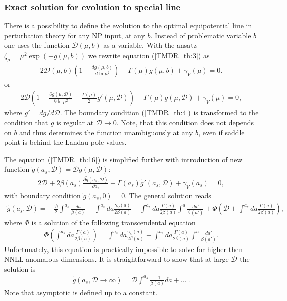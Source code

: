 \documentclass[prd,nofootinbib,eqsecnum,final]{revtex4}
\renewcommand{\(}{\left(}
\renewcommand{\)}{\right)}
\renewcommand{\[}{\left[}
\renewcommand{\]}{\right]}
\begin{document}
\subsubsection{Exact solution for evolution to special line}

There is a possibility to define the evolution to the optimal equipotential line in perturbation theory for any NP input, at any $b$. Instead of problematic variable $b$ one uses the function $\mathcal{D}(\mu,b)$ as a variable. With the ansatz $\zeta_\mu=\mu^2 \exp(-g(\mu,b))$ we rewrite equation (\ref{TMDR_th:3}) as
\begin{eqnarray}
2\mathcal{D}(\mu,b)\(1-\frac{dg(\mu,b)}{d\ln \mu^2}\)-\Gamma(\mu)g(\mu,b)+\gamma_V(\mu)=0.
\end{eqnarray}
or
\begin{eqnarray}\label{TMDR_th:16}
2\mathcal{D}\(1-\frac{\partial g(\mu,\mathcal{D})}{\partial \ln \mu^2}-\frac{\Gamma(\mu)}{2}g'(\mu,\mathcal{D})\)-\Gamma(\mu)g(\mu,\mathcal{D})+\gamma_V(\mu)=0,
\end{eqnarray}
where $g'=d g/d\mathcal{D}$. The boundary condition (\ref{TMDR_th:4}) is transformed to the condition that $g$ is regular at $\mathcal{D}\to 0$. Note, that this condition does not depends on $b$ and thus determines the function unambiguously at any $b$, even if saddle point is behind the Landau-pole values. 

The equation (\ref{TMDR_th:16}) is simplified further with introduction of new function $\tilde g(a_s,\mathcal{D})=\mathcal{D} g(\mu,\mathcal{D})$:
\begin{eqnarray}\label{TMDR_th:17}
2\mathcal{D}+2\beta(a_s)\frac{\partial \tilde g(a_s,\mathcal{D})}{\partial a_s}-\Gamma(a_s)\tilde g'(a_s,\mathcal{D})+\gamma_V(a_s)=0,
\end{eqnarray}
with boundary condition $\tilde g(a_s,0)=0$. The general solution reads
\begin{eqnarray}
\tilde g(a_s,\mathcal{D})=-\frac{\mathcal{D}}{2}\int^{a_s} \frac{da}{\beta(a)}-\int^{a_s} da \frac{\gamma_V(a)}{2\beta(a)}
-\int^{a_s} da \frac{\Gamma(a)}{2\beta(a)}\int^a\frac{da'}{\beta(a')}+\Phi\(\mathcal{D}+\int^{a_s} da \frac{\Gamma(a)}{2\beta(a)}\),
\end{eqnarray}
where $\Phi$ is a solution of the following transcendental equation
\begin{eqnarray}
\Phi\(\int^{a_s} da \frac{\Gamma(a)}{2\beta(a)}\)=\int^{a_s} da \frac{\gamma_V(a)}{2\beta(a)}
+\int^{a_s} da \frac{\Gamma(a)}{2\beta(a)}\int^a\frac{da'}{\beta(a')}.
\end{eqnarray}
Unfortunately, this equation is practically impossible to solve for higher then NNLL anomalous dimensions. It is straightforward to show that at large-$\mathcal{D}$ the solution is
\begin{eqnarray}
\tilde g(a_s,\mathcal{D}\to \infty)=\mathcal{D}\int^{a_s}\frac{-1}{\beta(a)}da+...~.
\end{eqnarray}
Note that asymptotic is defined up to a constant.
\end{document}
